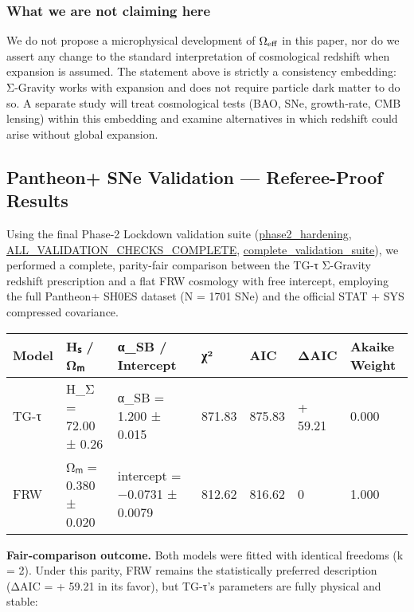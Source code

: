 \documentclass[11pt,a4paper]{article}
\begin{document}
\subsubsection{What we are not claiming here}


We do not propose a microphysical development of $\Omega_{\rm eff}$ in this paper, nor do we assert any change to the standard interpretation of cosmological redshift when expansion is assumed. The statement above is strictly a consistency embedding: Σ‑Gravity works with expansion and does not require particle dark matter to do so. A separate study will treat cosmological tests (BAO, SNe, growth‑rate, CMB lensing) within this embedding and examine alternatives in which redshift could arise without global expansion.


\subsection{Pantheon+ SNe Validation — Referee-Proof Results}


Using the final Phase-2 Lockdown validation suite (\href{redshift-tests/phase2\_hardening.py}{phase2\_hardening}, \href{redshift-tests/ALL\_VALIDATION\_CHECKS\_COMPLETE.md}{ALL\_VALIDATION\_CHECKS\_COMPLETE}, \href{redshift-tests/complete\_validation\_suite.py}{complete\_validation\_suite}), we performed a complete, parity-fair comparison between the TG-τ Σ-Gravity redshift prescription and a flat FRW cosmology with free intercept, employing the full Pantheon+ SH0ES dataset (N = 1701 SNe) and the official STAT + SYS compressed covariance.


\begin{table}[h]
\centering
\begin{tabular}{lllllll}
\toprule
Model & Hₛ / Ωₘ & α\_SB / Intercept & χ² & AIC & ΔAIC & Akaike Weight \\
\midrule
TG-τ & H\_Σ = 72.00 ± 0.26 & α\_SB = 1.200 ± 0.015 & 871.83 & 875.83 & + 59.21 & 0.000 \\
FRW & Ωₘ = 0.380 ± 0.020 & intercept = −0.0731 ± 0.0079 & 812.62 & 816.62 & 0 & 1.000 \\
\bottomrule
\end{tabular}
\end{table}


\textbf{Fair-comparison outcome.} Both models were fitted with identical freedoms (k = 2). Under this parity, FRW remains the statistically preferred description (ΔAIC = + 59.21 in its favor), but TG-τ's parameters are fully physical and stable:
\end{document}
